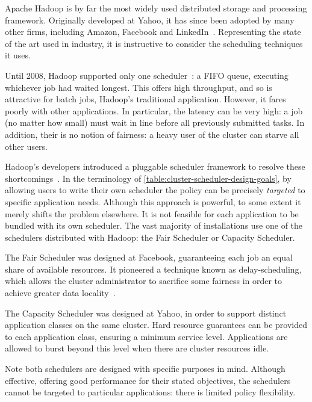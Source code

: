 Apache Hadoop is by far the most widely used distributed storage and processing framework. Originally developed at Yahoo, it has since been adopted by many other firms, including Amazon, Facebook and LinkedIn~\cite{HadoopPoweredBy}. Representing the state of the art used in industry, it is instructive to consider the scheduling techniques it uses.

Until 2008, Hadoop supported only one scheduler~\cite{HadoopFairSchedulerJIRA}: a FIFO queue, executing whichever job had waited longest. This offers high throughput, and so is attractive for batch jobs, Hadoop's traditional application. However, it fares poorly with other applications. In particular, the latency can be very high: a job (no matter how small) must wait in line before all previously submitted tasks. In addition, their is no notion of fairness: a heavy user of the cluster can starve all other users.

Hadoop's developers introduced a pluggable scheduler framework to resolve these shortcomings~\cite{HadoopSchedulingIBM}. In the terminology of \cref{table:cluster-scheduler-design-goals}, by allowing users to write their own scheduler the policy can be precisely \emph{targeted} to specific application needs. Although this approach is powerful, to some extent it merely shifts the problem elsewhere. It is not feasible for each application to be bundled with its own scheduler\footnotemark. The vast majority of installations use one of the schedulers distributed with Hadoop: the Fair Scheduler or Capacity Scheduler.

The Fair Scheduler was designed at Facebook, guaranteeing each job an equal share of available resources. It pioneered a technique known as delay-scheduling, which allows the cluster administrator to sacrifice some fairness in order to achieve greater data locality~\cite{Zaharia:2010}. 

The Capacity Scheduler was designed at Yahoo, in order to support distinct application classes on the same cluster. Hard resource guarantees can be provided to each application class, ensuring a minimum service level. Applications are allowed to burst beyond this level when there are cluster resources idle.

Note both schedulers are designed with specific purposes in mind. Although effective, offering good performance for their stated objectives, the schedulers cannot be targeted to particular applications: there is limited policy flexibility.

